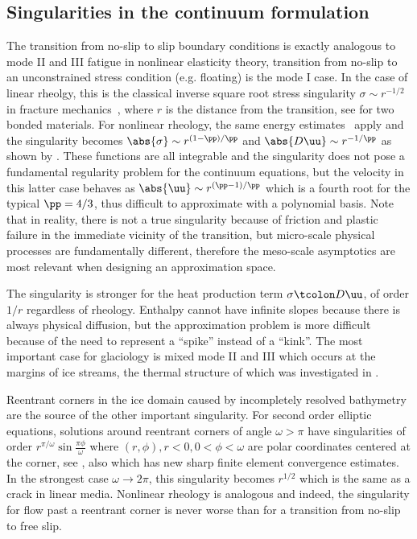 \subsection{Singularities in the continuum formulation}
The transition from no-slip to slip boundary conditions is exactly analogous to mode II and III fatigue in nonlinear elasticity theory, transition from no-slip to an unconstrained stress condition (e.g. floating) is the mode I case.
In the case of linear rheolgy, this is the classical inverse square root stress singularity $\sigma \sim r^{-1/2}$ in fracture mechanics~\cite{anderson2005fracture}, where $r$ is the distance from the transition, see \cite{erdogan1973two} for two bonded materials.
For nonlinear rheology, the same energy estimates~\cite{rice1968path} apply and the singularity becomes $\abs{\sigma} \sim r^{(1-\pp)/\pp}$ and $\abs{D\uu} \sim r^{-1/\pp}$ as shown by \cite{rice1968plane,hutchinson1968singular}. 
These functions are all integrable and the singularity does not pose a fundamental regularity problem for the continuum equations, but the velocity in this latter case behaves as $\abs{\uu} \sim r^{(\pp-1)/\pp}$ which is a fourth root for the typical $\pp = 4/3$, thus difficult to approximate with a polynomial basis.
Note that in reality, there is not a true singularity because of friction and plastic failure in the immediate vicinity of the transition, but micro-scale physical processes are fundamentally different, therefore the meso-scale asymptotics are most relevant when designing an approximation space.

The singularity is stronger for the heat production term $\sigma\tcolon D\uu$, of order $1/r$ regardless of rheology.
Enthalpy cannot have infinite slopes because there is always physical diffusion, but the approximation problem is more difficult because of the need to represent a ``spike'' instead of a ``kink''.
The most important case for glaciology is mixed mode II and III which occurs at the margins of ice streams, the thermal structure of which was investigated in \cite{jacobson1998thermal,raymond2000energy}.

Reentrant corners in the ice domain caused by incompletely resolved bathymetry are the source of the other important singularity.
For second order elliptic equations, solutions around reentrant corners of angle $\omega > \pi$ have singularities of order $r^{\pi/\omega}\sin\frac{\pi\phi}{\omega}$ where $(r,\phi), r < 0, 0 < \phi < \omega$ are polar coordinates centered at the corner, see \cite{grisvard1985elliptic,nazarov1994elliptic}, also \cite{bacuta2003regularity} which has new sharp finite element convergence estimates.
In the strongest case $\omega\to 2\pi$, this singularity becomes $r^{1/2}$ which is the same as a crack in linear media.
Nonlinear rheology is analogous and indeed, the singularity for flow past a reentrant corner is never worse than for a transition from no-slip to free slip.

